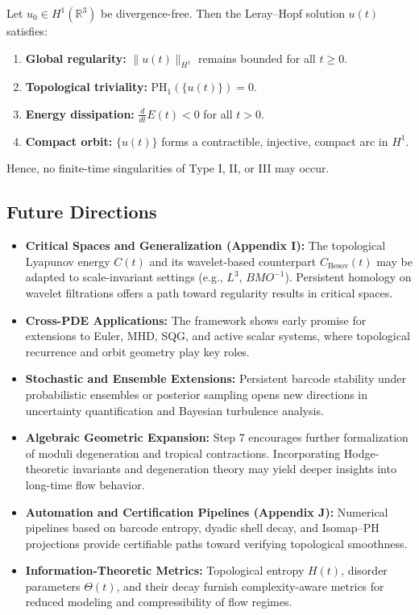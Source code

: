 \documentclass[11pt]{article}
\theoremstyle{definition}
\begin{document}
Let $u_0 \in H^1(\mathbb{R}^3)$ be divergence-free. Then the Leray–Hopf solution $u(t)$ satisfies:

\begin{enumerate}
    \item \textbf{Global regularity:} $\|u(t)\|_{H^1}$ remains bounded for all $t \geq 0$.
    \item \textbf{Topological triviality:} $\mathrm{PH}_1(\{u(t)\}) = 0$.
    \item \textbf{Energy dissipation:} $\frac{d}{dt}E(t) < 0$ for all $t > 0$.
    \item \textbf{Compact orbit:} $\{u(t)\}$ forms a contractible, injective, compact arc in $H^1$.
\end{enumerate}

Hence, no finite-time singularities of Type I, II, or III may occur.

\subsection*{Future Directions}

\begin{itemize}
    \item \textbf{Critical Spaces and Generalization (Appendix I):} The topological Lyapunov energy $C(t)$ and its wavelet-based counterpart $C_{\text{Besov}}(t)$ may be adapted to scale-invariant settings (e.g., $L^3$, $BMO^{-1}$). Persistent homology on wavelet filtrations offers a path toward regularity results in critical spaces.

    \item \textbf{Cross-PDE Applications:} The framework shows early promise for extensions to Euler, MHD, SQG, and active scalar systems, where topological recurrence and orbit geometry play key roles.

    \item \textbf{Stochastic and Ensemble Extensions:} Persistent barcode stability under probabilistic ensembles or posterior sampling opens new directions in uncertainty quantification and Bayesian turbulence analysis.

    \item \textbf{Algebraic Geometric Expansion:} Step 7 encourages further formalization of moduli degeneration and tropical contractions. Incorporating Hodge-theoretic invariants and degeneration theory may yield deeper insights into long-time flow behavior.

    \item \textbf{Automation and Certification Pipelines (Appendix J):} Numerical pipelines based on barcode entropy, dyadic shell decay, and Isomap–PH projections provide certifiable paths toward verifying topological smoothness.

    \item \textbf{Information-Theoretic Metrics:} Topological entropy $H(t)$, disorder parameters $\Theta(t)$, and their decay furnish complexity-aware metrics for reduced modeling and compressibility of flow regimes.
\end{itemize}
\end{document}

